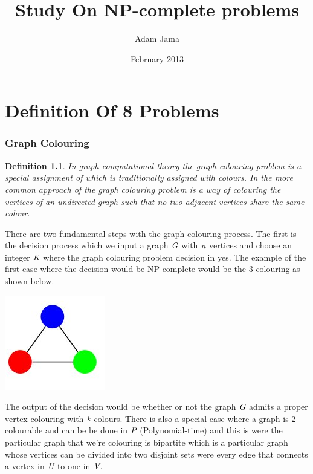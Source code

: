 \documentclass[a4paper]{report}
\newtheorem{defi}{Definition}
\begin{document}
\title{Study On NP-complete problems}
\author{Adam Jama}
\date{February 2013}

\maketitle


\chapter{Definition Of 8 Problems}

\subsection{Graph Colouring}
\begin{defi}
In graph computational theory the graph colouring problem is a special assignment of which is traditionally assigned with colours. In the more common approach of the graph colouring problem is a way of colouring the vertices of an undirected graph such that no two adjacent vertices share the same colour.
\end{defi}

There are two fundamental steps with the graph colouring process. The first is the decision process which we input a graph $\emph{G}$ with $\emph{n}$ vertices and choose an integer $\emph{K}$ where the graph colouring problem decision in yes. The example of the first case where the decision would be NP-complete would be the 3 colouring as shown below.



\begin{center}
\includegraphics[scale=0.77]{3colouring.png}
\end{center}

The output of the decision would be whether or not the graph $\emph{G}$ admits a proper vertex colouring with $\emph{k}$ colours. There is also a special case where a graph is 2 colourable and can be be done in $\emph{P}$ (Polynomial-time) and this is were the particular graph that we're colouring is bipartite which is a particular graph whose vertices can be divided into two disjoint sets were every edge that connects a vertex in $\emph{U}$ to one in $\emph{V}$.
\end{document}
